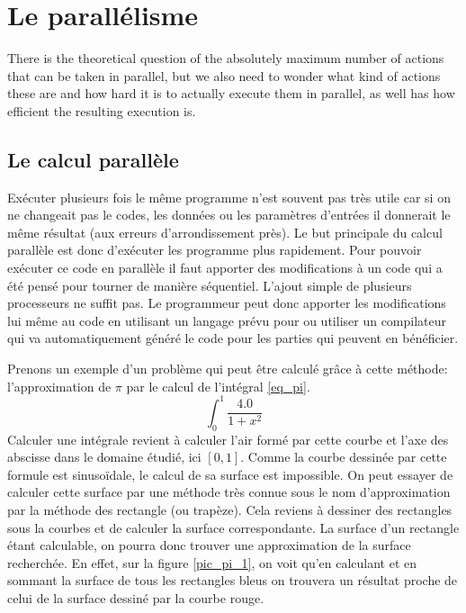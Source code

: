 \section{Le parallélisme}
There is the theoretical question of the absolutely maximum number of actions that can be taken in parallel, but we also need to wonder what kind of actions these are and how hard it is to actually execute them in parallel, as well has how efficient the resulting execution is.





\subsection{Le calcul parallèle}
\label{sub_reso_partage} 

Exécuter plusieurs fois le même programme n'est souvent pas très utile car si on ne changeait pas le codes, les données ou les paramètres d'entrées il donnerait le même résultat (aux erreurs d'arrondissement près). Le but principale du calcul parallèle est donc d'exécuter les programme plus rapidement. Pour pouvoir exécuter ce code en parallèle il faut apporter des modifications à un code qui a été pensé pour tourner de manière séquentiel. L'ajout simple de plusieurs processeurs ne suffit pas. Le programmeur peut donc apporter les modifications lui même au code en utilisant un langage prévu pour ou utiliser un compilateur qui va automatiquement généré le code pour les parties qui peuvent en bénéficier. 


 Prenons un exemple d'un problème qui peut être calculé grâce à cette méthode: l'approximation de $\pi$ par le calcul de l'intégral \ref{eq_pi}.
\begin{equation}
\label{eq_pi}
\int_{0}^{1} \frac{4.0}{1 + x^{2}}
\end{equation}
Calculer une intégrale revient à calculer l'air formé par cette courbe et l'axe des abscisse dans le domaine étudié, ici $[0,1]$. Comme la courbe dessinée par cette formule est sinusoïdale, le calcul de sa surface est impossible. On peut essayer de calculer cette surface par une méthode très connue sous le nom d'approximation par la méthode des rectangle (ou trapèze).
Cela reviens à dessiner des rectangles sous la courbes et de calculer la surface correspondante. La surface d'un rectangle étant calculable, on pourra donc trouver une approximation de la surface recherchée. En effet, sur la figure \ref{pic_pi_1}, on voit qu'en calculant et en sommant la surface de tous les rectangles bleus on trouvera un résultat proche de celui de la surface dessiné par la courbe rouge. 

